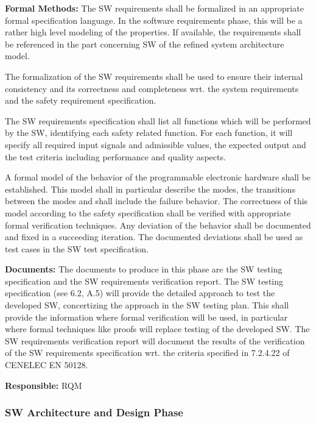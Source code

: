 {\bf Formal Methods:} The SW requirements shall be formalized in an appropriate
formal specification language. In the software requirements phase, this will be
a rather high level modeling of the properties. If available, the requirements
shall be referenced in the part concerning SW of the refined system architecture
model.

The formalization of the SW requirements shall be used to ensure their internal
consistency and its correctness and completeness wrt. the system requirements
and the safety requirement specification.

The SW requirements specification shall list all functions which will be
performed by the SW, identifying each safety related function. For each
function, it will specify all required input signals and admissible values, the
expected output and the test criteria including performance and quality aspects.

A formal model of the behavior of the programmable electronic hardware shall be
established. This model shall in particular describe the modes, the transitions
between the modes and shall include the failure behavior. The correctness of
this model according to the safety specification shall be verified with
appropriate formal verification techniques. Any deviation of the behavior shall
be documented and fixed in a succeeding iteration. The documented deviations
shall be used as test cases in the SW test specification.

{\bf Documents:} The documents to produce in this phase are the SW testing
specification and the SW requirements verification report. The SW testing
specification (see 6.2, A.5) will provide the detailed approach to test the
developed SW, concertizing the approach in the SW testing plan. This shall
provide the information where formal verification will be used, in particular
where formal techniques like proofs will replace testing of the developed SW.
The SW requirements verification report will document the results of the
verification of the SW requirements specification wrt. the criteria specified in
7.2.4.22 of CENELEC EN 50128.

{\bf Responsible:} RQM

\subsubsection{SW Architecture and Design Phase}
\label{sec:sw-arch-design}




